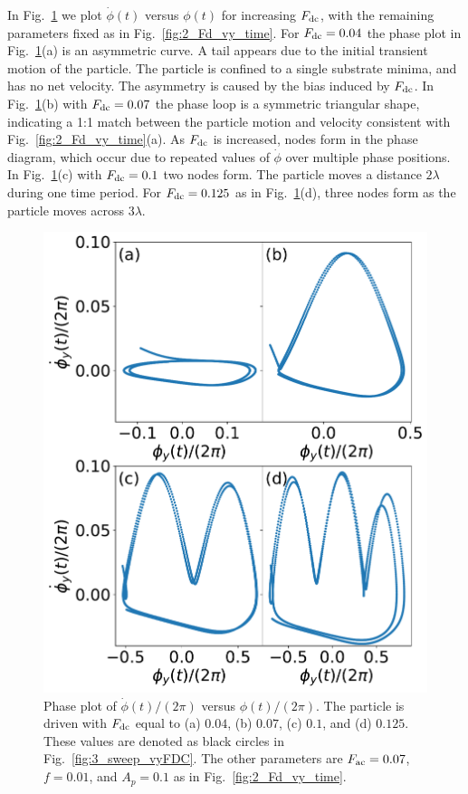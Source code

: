 \documentclass[preprint,showpacs,preprintnumbers,amsmath,amssymb,aps,prb]{revtex4-1}
\theoremstyle{remark}
\begin{document}
  In Fig.~\ref{fig:4_phase}
  we plot $\dot{\phi}(t)$ versus $\phi(t)$
  for increasing 
  $F_{\rm dc}$, 
  with the remaining parameters fixed as in Fig.~\ref{fig:2_Fd_vy_time}.
For
  $F_{\rm dc} = 0.04$
  the phase plot   in Fig.~\ref{fig:4_phase}(a)  is an
  asymmetric curve.
  A tail appears
  due to the initial transient
  motion of the particle.
  The particle is confined to a single
  substrate minima,
  and has no net velocity.
  The asymmetry is caused by the bias induced by $F_{\rm dc}$.
  In Fig.~\ref{fig:4_phase}(b)
  with $F_{\rm dc} = 0.07$
  the phase loop is a symmetric triangular shape,
  indicating a 1:1 match between the
  particle motion and velocity consistent with 
  Fig.~\ref{fig:2_Fd_vy_time}(a).
  As $F_{\rm dc}$ is
  increased,
  nodes form in the phase diagram, which occur
  due to repeated values
  of $\dot{\phi}$ over multiple phase positions.
  In Fig.~\ref{fig:4_phase}(c)
  with $F_{\rm dc} = 0.1$
  two nodes form.
  The particle moves a distance $2\lambda$
  during one time period.
For $F_{\rm dc} = 0.125$ as in Fig.~\ref{fig:4_phase}(d),
  three nodes form as the particle moves across $3\lambda$.
  
    \begin{figure}[h!]
      \centering
      \includegraphics[width=\columnwidth]{fig4_phase.pdf}
      \caption{
        Phase plot of $\dot{\phi}(t)/(2\pi)$ versus $\phi(t)/(2\pi)$.
        The particle is driven with $F_{\rm dc}$ equal to  (a) $0.04$, (b) $0.07$, (c) $0.1$, and (d) $0.125$.  These values are denoted as black circles
        in Fig.~\ref{fig:3_sweep_vyFDC}. 
      The other parameters
      are $F_{\rm ac} = 0.07$, $f=0.01$, and $A_p = 0.1$
      as in Fig.~\ref{fig:2_Fd_vy_time}.}
      \label{fig:4_phase}
    \end{figure}
\end{document}
